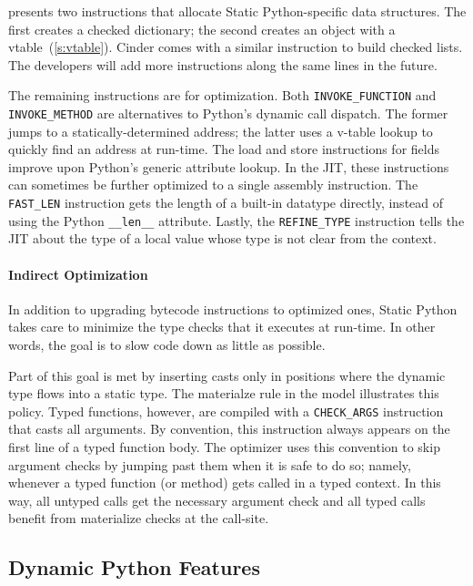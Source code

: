 \documentclass[english,cleveref,submission]{programming}
\newcommand{\SP}{Static Python}
\newcommand{\code}[1]{\texttt{#1}}
\newcommand{\bcinst}[1]{\code{#1}}
\begin{document}
 presents two instructions that allocate \SP{}-specific data structures.
The first creates a checked dictionary; the second creates an object with a vtable~(\cref{s:vtable}).
Cinder comes with a similar instruction to build checked lists.
The developers will add more instructions along the same lines in the future.

The remaining instructions are for optimization.
Both \bcinst{INVOKE\_FUNCTION} and \bcinst{INVOKE\_METHOD} are alternatives
to Python's dynamic call dispatch.
The former jumps to a statically-determined address;
the latter uses a v-table lookup to quickly find an address at run-time.
The load and store instructions for fields improve upon Python's generic attribute lookup.
In the JIT, these instructions can sometimes be further optimized to a single assembly instruction.
The \bcinst{FAST\_LEN} instruction gets the length of a built-in datatype directly, instead
of using the Python \code{\_\_len\_\_} attribute.
Lastly, the \bcinst{REFINE\_TYPE} instruction tells the JIT about the type of a local value whose
type is not clear from the context.


\paragraph{Indirect Optimization}

In addition to upgrading bytecode instructions to optimized ones, \SP{} takes care
to minimize the type checks that it executes at run-time.
In other words, the goal is to slow code down as little as possible.

Part of this goal is met by inserting casts only in positions where the dynamic
type flows into a static type.
The materialze rule in the model illustrates this policy.
Typed functions, however, are compiled with a \bcinst{CHECK\_ARGS} instruction
that casts all arguments.
By convention, this instruction always appears on the first line of a typed
function body.
The optimizer uses this convention to skip argument checks by jumping past them
when it is safe to do so; namely, whenever a typed function (or method) gets
called in a typed context.
In this way, all untyped calls get the necessary argument check and all typed
calls benefit from materialize checks at the call-site.


\subsection{Dynamic Python Features}
\label{s:dynamic-python}
\end{document}
